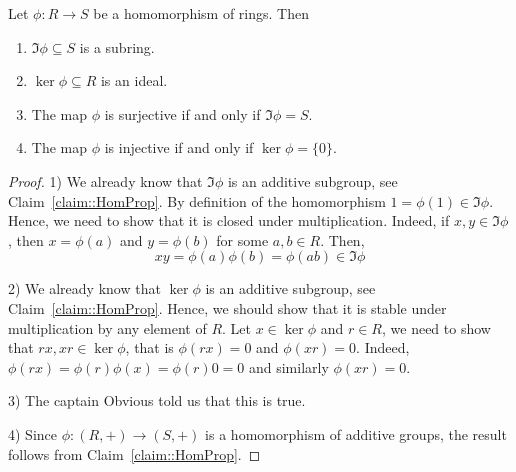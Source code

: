 \begin{claim}
\label{claim::RingHomProp}
Let $\phi\colon R\to S$ be a homomorphism of rings.
Then
\begin{enumerate}
\item $\Im\phi\subseteq S$ is a subring.

\item $\ker \phi\subseteq R$ is an ideal.

\item The map $\phi$ is surjective if and only if $\Im\phi = S$.

\item The map $\phi$ is injective if and only if $\ker \phi = \{0\}$.
\end{enumerate}
\end{claim}
\begin{proof}
1) We already know that $\Im \phi$ is an additive subgroup, see Claim~\ref{claim::HomProp}.
By definition of the homomorphism $1 = \phi(1) \in \Im \phi$.
Hence, we need to show that it is closed under multiplication.
Indeed, if $x,y\in \Im\phi$, then $x = \phi(a)$ and $y = \phi(b)$ for some $a,b\in R$.
Then,
\[
xy = \phi(a) \phi(b) = \phi(ab) \in \Im \phi
\]

2) We already know that $\ker \phi$ is an additive subgroup, see Claim~\ref{claim::HomProp}.
Hence, we should show that it is stable under multiplication by any element of $R$.
Let $x\in \ker \phi$ and $r\in R$, we need to show that $rx, xr \in \ker \phi$, that is $\phi(rx) = 0$ and $\phi(xr) = 0$.
Indeed, $\phi(rx) = \phi(r)\phi(x) = \phi(r) 0 = 0$ and similarly $\phi(xr) = 0$.

3) The captain Obvious told us that this is true.

4) Since $\phi\colon (R,+)\to (S,+)$ is a homomorphism of additive groups, the result follows from Claim~\ref{claim::HomProp}.

\end{proof}




